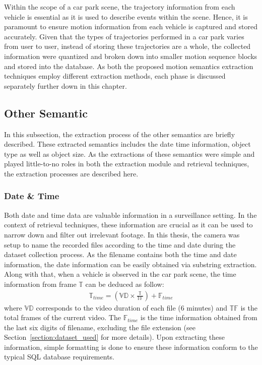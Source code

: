 Within the scope of a car park scene, the trajectory information from each vehicle is essential as it is used to describe events within the scene.
Hence, it is paramount to ensure motion information from each vehicle is captured and stored accurately.
Given that the types of trajectories performed in a car park varies from user to user, instead of storing these trajectories are a whole, the collected information were quantized and broken down into smaller motion sequence blocks and stored into the database.
As both the proposed motion semantics extraction techniques employ different extraction methods, each phase is discussed separately further down in this chapter.

\subsection{Other Semantic}

In this subsection, the extraction process of the other semantics are briefly described. These extracted semantics includes the date time information, object type as well as object size. As the extractions of these semantics were simple and played little-to-no roles in both the extraction module and retrieval techniques, the extraction processes are described here.

\subsubsection{Date \& Time}

Both date and time data are valuable information in a surveillance setting. In the context of retrieval techniques, these information are crucial as it can be used to narrow down and filter out irrelevant footage. In this thesis, the camera was setup to name the recorded files according to the time and date during the dataset collection process. As the filename contains both the time and date information, the date information can be easily obtained via substring extraction. Along with that, when a vehicle is observed in the car park scene, the time information from frame $\mathbb{T}$ can be deduced as follow:
\begin{align}
    \mathbb{T}_{time}  = (\mathbb{VD} \times \frac{\mathbb{T}}{\mathbb{TF}}) + \mathbb{F}_{time}
\end{align}
where $\mathbb{VD}$ corresponds to the video duration of each file (6 minutes) and $\mathbb{TF}$ is the total frames of the current video. The $\mathbb{F}_{time}$ is the time information obtained from the last six digits of filename, excluding the file extension (see Section~\ref{section:dataset_used} for more details). Upon extracting these information, simple formatting is done to ensure these information conform to the typical SQL database requirements.


